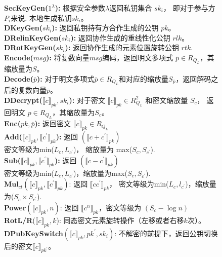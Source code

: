 \begin{figure}[!htb]
	\begin{framed}
		\noindent \textbf{SecKeyGen($1^\lambda$):} 根据安全参数$ \lambda $返回私钥集合 ${sk_i}$，
		即对于参与方$P_i$来说. 本地生成私钥$ sk_i $。\\
		\noindent \textbf{DKeyGen(${sk_i}$):} 返回私钥持有方合作生成的公钥 $pk$。\\
		\noindent \textbf{DRelinKeyGen(${sk_i}$):} 返回协作生成的重线性化公钥 $rlk$。\\
		\noindent \textbf{DRotKeyGen(${sk_i}$):} 返回协作生成的元素位置旋转公钥 $rtk$.\\
		\noindent \textbf{Encode($msg$):} 将复数向量$msg$编码，返回明文多项式 $\overline{p}\in R_{Q_{L}}$，其缩放量为$S$。\\
		\noindent \textbf{Decode($\overline{p}$):} 对于明文多项式$\overline{p}\in R_{Q_{L}}$和对应的缩放量$S_{\overline{p}}$，返回解码之后的复数向量$\overline{p}$。\\
		\noindent \textbf{DDecrypt($\llbracket c\rrbracket_{pk}, {sk_i}$):} 对于密文 $\llbracket c\rrbracket_{pk}\in R^2_{Q_{L}}$ 和密文缩放量 $S_c$， 返回明文 $p\in R_{Q_{L}}$，其缩放量为$S_c$。\\
		\noindent \textbf{Enc($pk, \overline{p}$):} 返回密文 $\llbracket c\rrbracket_{pk}\in R_{Q_{L}}$ \\
		\noindent \textbf{Add($\llbracket c\rrbracket_{pk}, \llbracket c^{\prime}\rrbracket_{pk}$):} 返回 $(\llbracket c+c^{\prime}\rrbracket_{pk})$ \\
		密文等级为min($L_c, L_{c^{\prime}}$)， 缩放量为 max($S_c, S_{c^{\prime}}$).\\
		\noindent \textbf{Sub($\llbracket c\rrbracket_{pk}, \llbracket c^{\prime}\rrbracket_{pk}$):} 返回 $(\llbracket c-c^{\prime}\rrbracket_{pk})$ \\
		密文等级为min($L_c, L_{c^{\prime}}$)，缩放量为max($S_c, S_{c^{\prime}}$).\\
		\noindent $\textbf{Mul}_{ct}$$(\llbracket c\rrbracket_{pk}, \llbracket c^{\prime}\rrbracket_{pk})$: 返回 $\llbracket cc^{\prime}\rrbracket_{pk}$， 密文等级为min($L_c, l_{c^{\prime}}$)，缩放量为($S_c\times S_{c^{\prime}}$).\\
		\noindent \textbf{Power}$(\llbracket c\rrbracket_{pk}, n)$: 返回 $\llbracket c^{n}\rrbracket_{pk}$，密文等级为 $(S_c-\log{n})$\\
		\noindent \textbf{RotL/R}($\llbracket c\rrbracket_{pk}, k$): 同态密文元素旋转操作（左移或者右移$k$次）。\\
		\noindent \textbf{DPubKeySwitch}$(\llbracket c\rrbracket_{pk}, pk^{\prime},{sk_i})$: 不解密的前提下，返回公钥切换后的密文$\llbracket c\rrbracket_{pk^{\prime}}$。\\
$$
\end{framed}
\end{figure}
